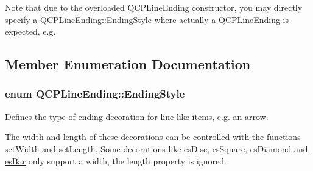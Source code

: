 Note that due to the overloaded \hyperlink{class_q_c_p_line_ending}{Q\+C\+P\+Line\+Ending} constructor, you may directly specify a \hyperlink{class_q_c_p_line_ending_a5ef16e6876b4b74959c7261d8d4c2cd5}{Q\+C\+P\+Line\+Ending\+::\+Ending\+Style} where actually a \hyperlink{class_q_c_p_line_ending}{Q\+C\+P\+Line\+Ending} is expected, e.\+g. 
\begin{DoxyCodeInclude}
\end{DoxyCodeInclude}


\subsection{Member Enumeration Documentation}
\subsubsection[{\texorpdfstring{Ending\+Style}{EndingStyle}}]{\setlength{\rightskip}{0pt plus 5cm}enum {\bf Q\+C\+P\+Line\+Ending\+::\+Ending\+Style}}\hypertarget{class_q_c_p_line_ending_a5ef16e6876b4b74959c7261d8d4c2cd5}{}\label{class_q_c_p_line_ending_a5ef16e6876b4b74959c7261d8d4c2cd5}
Defines the type of ending decoration for line-\/like items, e.\+g. an arrow.



The width and length of these decorations can be controlled with the functions \hyperlink{class_q_c_p_line_ending_a26dc020ea985a72cc25881ce2115e34e}{set\+Width} and \hyperlink{class_q_c_p_line_ending_ae36fa01763751cd64b7f56c3507e935a}{set\+Length}. Some decorations like \hyperlink{class_q_c_p_line_ending_a5ef16e6876b4b74959c7261d8d4c2cd5a4e7a48003d59b1eed00767e879440600}{es\+Disc}, \hyperlink{class_q_c_p_line_ending_a5ef16e6876b4b74959c7261d8d4c2cd5a8b0298e645008220cbc6cef9d05eb950}{es\+Square}, \hyperlink{class_q_c_p_line_ending_a5ef16e6876b4b74959c7261d8d4c2cd5a0a9e21dfaf144c9b8ae41711f61199e3}{es\+Diamond} and \hyperlink{class_q_c_p_line_ending_a5ef16e6876b4b74959c7261d8d4c2cd5a1683a6a39898f53737ee21d4fedba791}{es\+Bar} only support a width, the length property is ignored.

